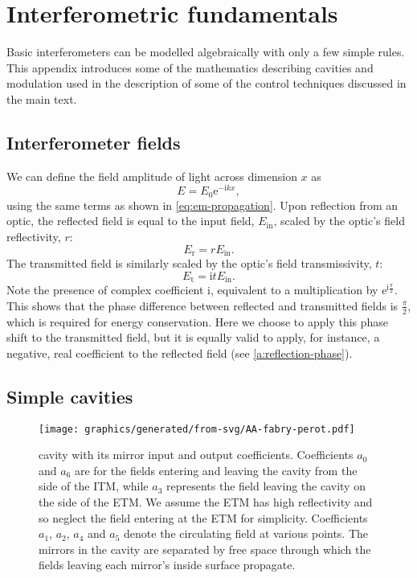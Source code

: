 \chapter{\label{a:interferometry}Interferometric fundamentals}
Basic interferometers can be modelled algebraically with only a few simple rules. This appendix introduces some of the mathematics describing \FP{} cavities and modulation used in the description of some of the control techniques discussed in the main text.

\section{Interferometer fields}
We can define the field amplitude of light across dimension $x$ as
\begin{equation}
  \label{eq:field-amplitude}
  E = E_0 \text{e}^{-\text{i} kx},
\end{equation}
using the same terms as shown in \cref{eq:em-propagation}. Upon reflection from an optic, the reflected field is equal to the input field, $E_{\text{in}}$, scaled by the optic's field reflectivity, $r$:
\begin{equation}
  \label{eq:reflected-field}
  E_{\text{r}} = rE_{\text{in}}.
\end{equation}
The transmitted field is similarly scaled by the optic's field transmissivity, $t$:
\begin{equation}
  \label{eq:transmitted-field}
  E_{\text{t}} = \text{i}tE_{\text{in}}.
\end{equation}
Note the presence of complex coefficient $\text{i}$, equivalent to a multiplication by $\text{e}^{\text{i} \frac{\pi}{2}}$. This shows that the phase difference between reflected and transmitted fields is $\frac{\pi}{2}$, which is required for energy conservation. Here we choose to apply this phase shift to the transmitted field, but it is equally valid to apply, for instance, a negative, real coefficient to the reflected field (see \cref{a:reflection-phase}).

\section{\label{sec:simple-cavities}Simple cavities}

\begin{figure}
  \centering
  \texttt{[image: graphics/generated/from-svg/AA-fabry-perot.pdf]}
  \caption[\FP{} cavity with its mirror input and output coefficients]{\label{fig:fabry-perot}\FP{} cavity with its mirror input and output coefficients. Coefficients $a_0$ and $a_6$ are for the fields entering and leaving the cavity from the side of the \gls{ITM}, while $a_3$ represents the field leaving the cavity on the side of the \gls{ETM}. We assume the \gls{ETM} has high reflectivity and so neglect the field entering at the \gls{ETM} for simplicity. Coefficients $a_1$, $a_2$, $a_4$ and $a_5$ denote the circulating field at various points. The mirrors in the cavity are separated by free space through which the fields leaving each mirror's inside surface propagate.}
\end{figure}

